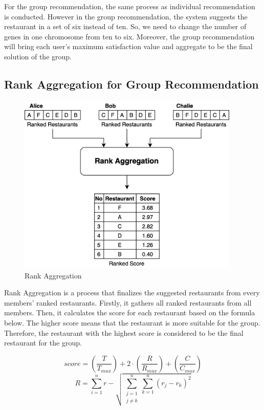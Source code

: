 \documentclass[12pt,oneside,openright,a4paper]{cpe-english-project}
\begin{document}
For the group recommendation, the same process as individual recommendation is conducted. However in the group recommendation, the system suggests the restaurant in a set of six instead of ten. So, we need to change the number of genes in one chromosome from ten to six. Moreover, the group recommendation will bring each user’s maximum satisfaction value and aggregate to be the final solution of the group.

\subsection{Rank Aggregation for Group Recommendation}


\begin{figure}[H]\centering
\includegraphics[width=300pt]{./images/3ga_rankagg.png}
\caption{Rank Aggregation}\label{fig:3ga_rankagg}
\end{figure}\vspace{-24pt}

Rank Aggregation is a process that finalizes the suggested restaurants from every members’ ranked restaurants. Firstly, it gathers all ranked restaurants from all members. Then, it calculates the score for each restaurant based on the formula below. The higher score means that the restaurant is more suitable for the group. Therefore, the restaurant with the highest score is considered to be the final restaurant for the group.

\begin{equation}\label{eq:rankaggscore}
score = \left (\frac{T}{T_{max}}  \right ) + 2\cdot \left (\frac{R}{R_{max}}  \right ) + \left (\frac{C}{C_{max}}  \right )
\end{equation}
\begin{equation}\label{eq:rankaggscorerank}
R = \sum_{i=1}^{n}r - \sqrt{\sum_{\substack{j=1 \\ j\neq k}}^{n}\sum_{k=1}^{n}(r_j - r_k)^2}
\end{equation}
\end{document}
